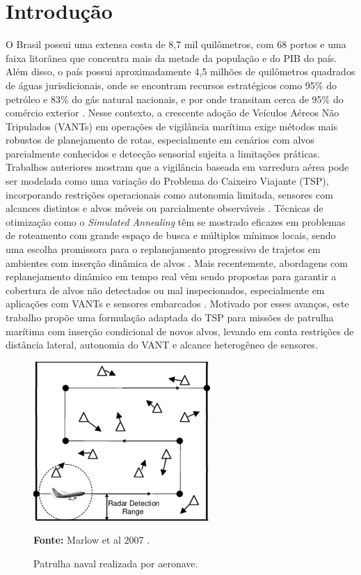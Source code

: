 \section{Introdução}

O Brasil possui uma extensa costa de 8{,}7 mil quilômetros, com 68 portos e uma faixa litorânea que concentra mais da metade da população e do PIB do país. Além disso, o país possui aproximadamente 4{,}5 milhões de quilômetros quadrados de águas jurisdicionais, onde se encontram recursos estratégicos como 95\% do petróleo e 83\% do gás natural nacionais, e por onde transitam cerca de 95\% do comércio exterior \cite{andrade_2021}.
Nesse contexto, a crescente adoção de Veículos Aéreos Não Tripulados (VANTs) em operações de vigilância marítima exige métodos mais robustos de planejamento de rotas, especialmente em cenários com alvos parcialmente conhecidos e detecção sensorial sujeita a limitações práticas. Trabalhos anteriores mostram que a vigilância baseada em varredura aérea pode ser modelada como uma variação do Problema do Caixeiro Viajante (TSP), incorporando restrições operacionais como autonomia limitada, sensores com alcances distintos e alvos móveis ou parcialmente observáveis \cite{marlow_2007}.
Técnicas de otimização como o \textit{Simulated Annealing} têm se mostrado eficazes em problemas de roteamento com grande espaço de busca e múltiplos mínimos locais, sendo uma escolha promissora para o replanejamento progressivo de trajetos em ambientes com inserção dinâmica de alvos \cite{kosmas_2012}.
Mais recentemente, abordagens com replanejamento dinâmico em tempo real vêm sendo propostas para garantir a cobertura de alvos não detectados ou mal inspecionados, especialmente em aplicações com VANTs e sensores embarcados \cite{penicka_2017}. Motivado por esses avanços, este trabalho propõe uma formulação adaptada do TSP para missões de patrulha marítima com inserção condicional de novos alvos, levando em conta restrições de distância lateral, autonomia do VANT e alcance heterogêneo de sensores.

\begin{figure}[H]
    \centering
    \includegraphics[width=0.6\textwidth]{fig/vant.png}
    \caption{Patrulha naval realizada por aeronave.}

    \small
    \textbf{Fonte:} Marlow et al 2007 \cite{marlow_2007}.
 \end{figure}